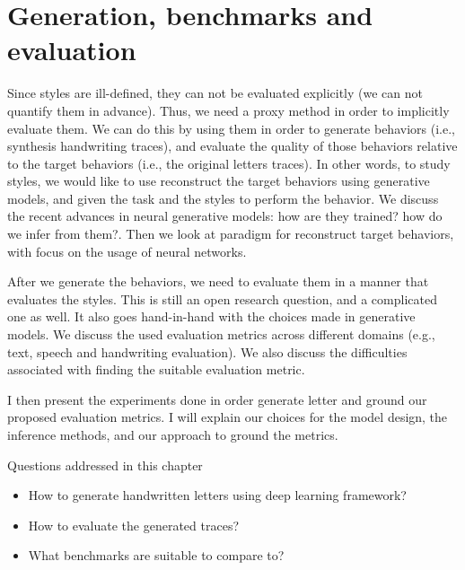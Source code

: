 \chapter{Generation, benchmarks and evaluation}\label{ch:GBEM}

\minitoc%

\par Since styles are ill-defined, they can not be evaluated explicitly (we can not quantify them in advance). Thus, we need a proxy method in order to implicitly evaluate them. We can do this by using them in order to generate behaviors (i.e., synthesis handwriting traces), and evaluate the quality of those behaviors relative to the target behaviors (i.e., the original letters traces). In other words, to study styles, we would like to use reconstruct the target behaviors using generative models, and given the task and the styles to perform the behavior. We discuss the recent advances in neural generative models: how are they trained? how do we infer from them?. Then we look at paradigm for reconstruct target behaviors, with focus on the usage of neural networks.

\par After we generate the behaviors, we need to evaluate them in a manner that evaluates the styles. This is still an open research question, and a complicated one as well. It also goes hand-in-hand with the choices made in generative models. We discuss the used evaluation metrics across different domains (e.g., text, speech and handwriting evaluation). We also discuss the difficulties associated with finding the suitable evaluation metric.

\par I then present the experiments done in order generate letter and ground our proposed evaluation metrics. I will explain our choices for the model design, the inference methods, and our approach to ground the metrics.


\begin{mdframed}[backgroundcolor=blue!20]
    \begin{center}
        Questions addressed in this chapter
    \end{center}

    \begin{itemize}
        \item How to generate handwritten letters using deep learning framework?
        \item How to evaluate the generated traces?
        \item What benchmarks are suitable to compare to?
    \end{itemize}
\end{mdframed}

